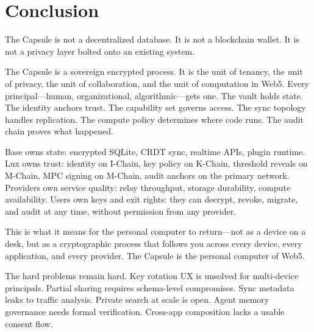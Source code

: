 

\section{Conclusion}
\label{sec:conclusion}

The Capsule is not a decentralized database. It is not a blockchain wallet.
It is not a privacy layer bolted onto an existing system.

The Capsule is a sovereign encrypted process. It is the unit of tenancy, the
unit of privacy, the unit of collaboration, and the unit of computation in
Web5. Every principal---human, organizational, algorithmic---gets one. The
vault holds state. The identity anchors trust. The capability set governs
access. The sync topology handles replication. The compute policy determines
where code runs. The audit chain proves what happened.

Base owns state: encrypted SQLite, CRDT sync, realtime APIs, plugin runtime.
Lux owns trust: identity on I-Chain, key policy on K-Chain, threshold reveals
on M-Chain, MPC signing on M-Chain, audit anchors on the primary network.
Providers own service quality: relay throughput, storage durability, compute
availability. Users own keys and exit rights: they can decrypt, revoke,
migrate, and audit at any time, without permission from any provider.

This is what it means for the personal computer to return---not as a device
on a desk, but as a cryptographic process that follows you across every device,
every application, and every provider. The Capsule is the personal computer
of Web5.

The hard problems remain hard. Key rotation UX is unsolved for multi-device
principals. Partial sharing requires schema-level compromises. Sync metadata
leaks to traffic analysis. Private search at scale is open. Agent memory
governance needs formal verification. Cross-app composition lacks a usable
consent flow.

